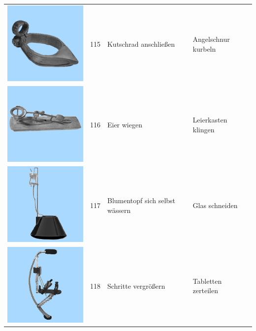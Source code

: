 \documentclass[
  english,
  doc,12pt,twoside,floatsintext]{apa7}
\begin{document}
\begin{center}
\begin{ThreePartTable}
\begin{longtable}{llll}
\includegraphics[valign=c, scale=0.19]{../materials/unfamiliar/115.png} & 115 & Kutschrad anschließen & Angelschnur kurbeln\\
\includegraphics[valign=c, scale=0.19]{../materials/unfamiliar/116.png} & 116 & Eier wiegen & Leierkasten klingen\\
\includegraphics[valign=c, scale=0.19]{../materials/unfamiliar/117.png} & 117 & Blumentopf sich selbst wässern & Glas schneiden\\
\includegraphics[valign=c, scale=0.19]{../materials/unfamiliar/118.png} & 118 & Schritte vergrößern & Tabletten zerteilen\\

\end{longtable}
\end{ThreePartTable}
\end{center}
\end{document}
